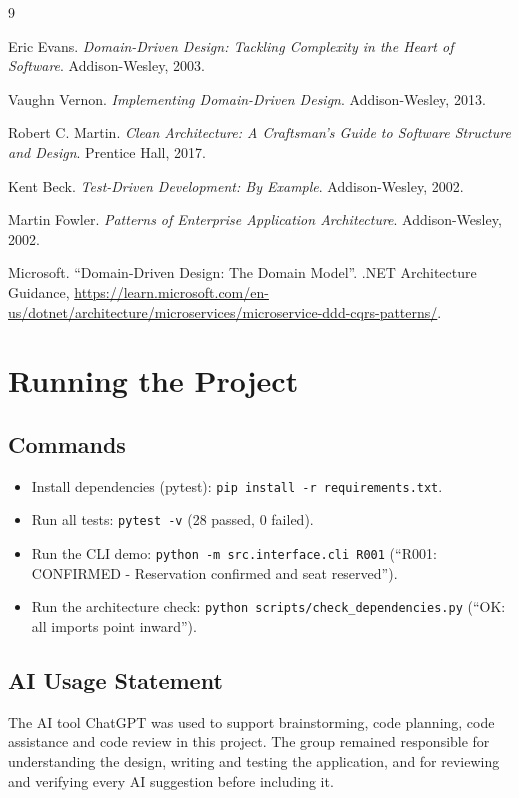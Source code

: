 \documentclass[11pt,a4paper]{article}
\newcommand{\code}[1]{\texttt{#1}}
\begin{document}
\begin{thebibliography}{9}

 Eric Evans.
  \emph{Domain-Driven Design: Tackling Complexity in the Heart of Software}.
  Addison-Wesley, 2003.

 Vaughn Vernon.
  \emph{Implementing Domain-Driven Design}.
  Addison-Wesley, 2013.

 Robert C. Martin.
  \emph{Clean Architecture: A Craftsman's Guide to Software Structure and
  Design}. Prentice Hall, 2017.

 Kent Beck.
  \emph{Test-Driven Development: By Example}.
  Addison-Wesley, 2002.

 Martin Fowler.
  \emph{Patterns of Enterprise Application Architecture}.
  Addison-Wesley, 2002.

 Microsoft.
  ``Domain-Driven Design: The Domain Model''.
  .NET Architecture Guidance,
  \url{https://learn.microsoft.com/en-us/dotnet/architecture/microservices/microservice-ddd-cqrs-patterns/}.

\end{thebibliography}

\appendix

\section{Running the Project}

\subsection{Commands}

\begin{itemize}
  \item Install dependencies (pytest): \code{pip install -r requirements.txt}.
  \item Run all tests: \code{pytest -v} (28 passed, 0 failed).
  \item Run the CLI demo: \code{python -m src.interface.cli R001}
        (``R001: CONFIRMED - Reservation confirmed and seat reserved'').
  \item Run the architecture check:
        \code{python scripts/check\_dependencies.py}
        (``OK: all imports point inward'').
\end{itemize}

\subsection{AI Usage Statement}

The AI tool ChatGPT was used to support brainstorming, code planning, code
assistance and code review in this project. The group remained responsible for
understanding the design, writing and testing the application, and for
reviewing and verifying every AI suggestion before including it.
\end{document}
